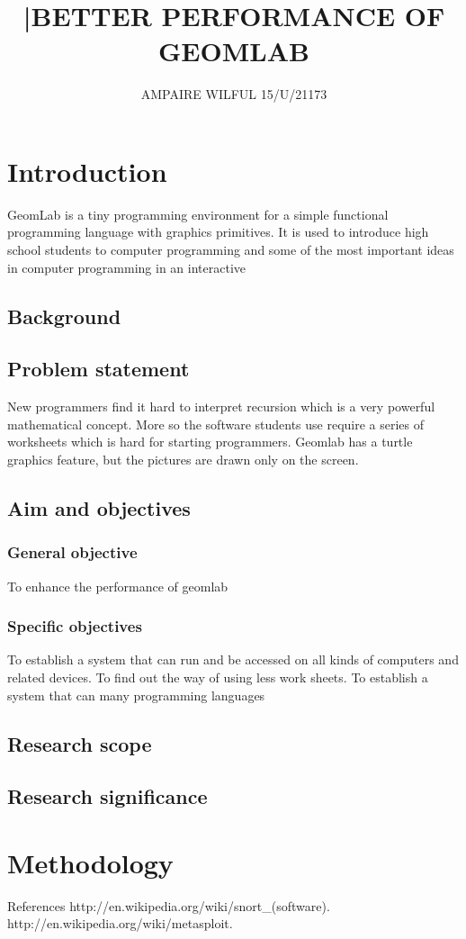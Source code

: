 \documentclass {article}
\begin{document}
\title {|BETTER PERFORMANCE OF GEOMLAB}
\author {AMPAIRE WILFUL 15/U/21173}
\maketitle
\section {Introduction}
GeomLab is a tiny programming environment for a simple functional programming language with graphics primitives.
 It is used to introduce high school students to computer programming and some of the most important ideas in computer programming in an interactive
\subsection {Background }



\subsection {Problem statement}
New programmers find it hard to interpret recursion which is a very powerful mathematical concept. More so the software students use require a series of worksheets which is hard for starting programmers. Geomlab has a turtle graphics feature, but the pictures are drawn only on the screen.
\subsection{ Aim and objectives}
\subsubsection{ General objective}
To enhance the performance of geomlab
 \subsubsection {Specific objectives}
To establish a system that can run and be accessed on all kinds of computers and related devices.
\newline To find out the way of using less work sheets.
\newline To establish a system that can many programming languages

\subsection {Research scope}
\subsection {Research significance}
\section{ Methodology}
{ References}
 http://en.wikipedia.org/wiki/snort_(software).
 \newline http://en.wikipedia.org/wiki/metasploit.
\end{document}
